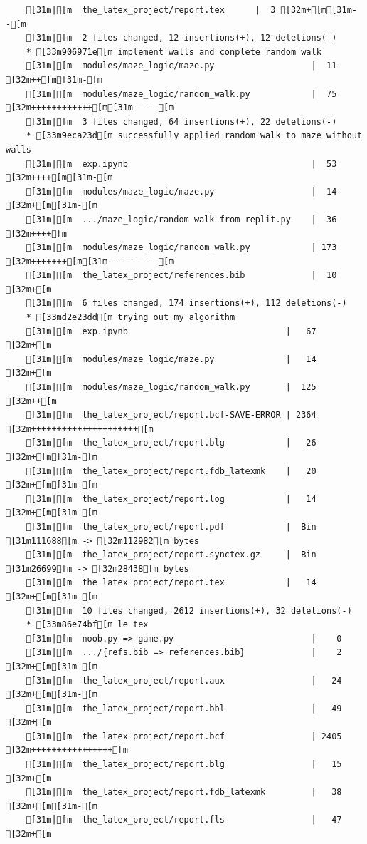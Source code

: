 \documentclass{article}
\begin{document}
{\begin{verbatim}
    [31m|[m  the_latex_project/report.tex      |  3 [32m+[m[31m--[m
    [31m|[m  2 files changed, 12 insertions(+), 12 deletions(-)
    * [33m906971e[m implement walls and conplete random walk
    [31m|[m  modules/maze_logic/maze.py                   |  11 [32m++[m[31m-[m
    [31m|[m  modules/maze_logic/random_walk.py            |  75 [32m++++++++++++[m[31m-----[m
    [31m|[m  3 files changed, 64 insertions(+), 22 deletions(-)
    * [33m9eca23d[m successfully applied random walk to maze without walls
    [31m|[m  exp.ipynb                                    |  53 [32m++++[m[31m-[m
    [31m|[m  modules/maze_logic/maze.py                   |  14 [32m+[m[31m-[m
    [31m|[m  .../maze_logic/random walk from replit.py    |  36 [32m++++[m
    [31m|[m  modules/maze_logic/random_walk.py            | 173 [32m+++++++[m[31m----------[m
    [31m|[m  the_latex_project/references.bib             |  10 [32m+[m
    [31m|[m  6 files changed, 174 insertions(+), 112 deletions(-)
    * [33md2e23dd[m trying out my algorithm
    [31m|[m  exp.ipynb                               |   67 [32m+[m
    [31m|[m  modules/maze_logic/maze.py              |   14 [32m+[m
    [31m|[m  modules/maze_logic/random_walk.py       |  125 [32m++[m
    [31m|[m  the_latex_project/report.bcf-SAVE-ERROR | 2364 [32m+++++++++++++++++++++[m
    [31m|[m  the_latex_project/report.blg            |   26 [32m+[m[31m-[m
    [31m|[m  the_latex_project/report.fdb_latexmk    |   20 [32m+[m[31m-[m
    [31m|[m  the_latex_project/report.log            |   14 [32m+[m[31m-[m
    [31m|[m  the_latex_project/report.pdf            |  Bin [31m111688[m -> [32m112982[m bytes
    [31m|[m  the_latex_project/report.synctex.gz     |  Bin [31m26699[m -> [32m28438[m bytes
    [31m|[m  the_latex_project/report.tex            |   14 [32m+[m[31m-[m
    [31m|[m  10 files changed, 2612 insertions(+), 32 deletions(-)
    * [33m86e74bf[m le tex
    [31m|[m  noob.py => game.py                           |    0
    [31m|[m  .../{refs.bib => references.bib}             |    2 [32m+[m[31m-[m
    [31m|[m  the_latex_project/report.aux                 |   24 [32m+[m[31m-[m
    [31m|[m  the_latex_project/report.bbl                 |   49 [32m+[m
    [31m|[m  the_latex_project/report.bcf                 | 2405 [32m++++++++++++++++[m
    [31m|[m  the_latex_project/report.blg                 |   15 [32m+[m
    [31m|[m  the_latex_project/report.fdb_latexmk         |   38 [32m+[m[31m-[m
    [31m|[m  the_latex_project/report.fls                 |   47 [32m+[m

\end{verbatim}}
\end{document}
